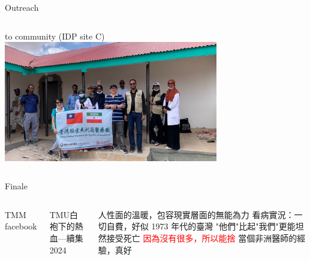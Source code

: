 \documentclass[aspectratio=169]{beamer}
\begin{document}
\begin{frame}{Outreach}
    \begin{columns}
    to community (IDP site C)
    \includegraphics[width=0.7\textwidth]{IMG_1713.jpeg}
    \end{columns}  
\end{frame}


\begin{frame}{Finale}
\begin{columns}
    
TMM facebook

TMU白袍下的熱血---續集2024
\begin{outline}


    \1 人性面的溫暖，包容現實層面的無能為力
        \2 看病實況：一切自費，好似 1973 年代的臺灣
        \2 "他們"比起"我們"更能坦然接受死亡
        \2 \textcolor{red}{因為沒有很多，所以能捨}
    \1 當個非洲醫師的經驗，真好

\end{outline}


\end{columns}
\end{frame}


\end{document}
